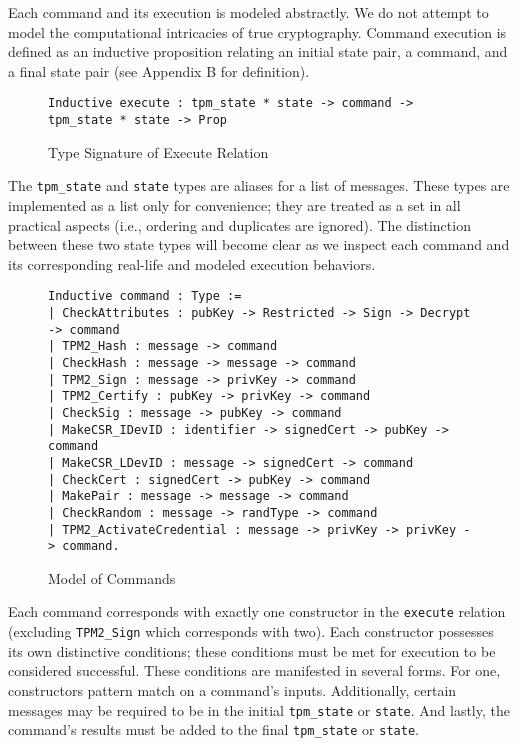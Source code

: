 Each command and its execution is modeled abstractly. We do not attempt to model the computational intricacies of true cryptography. Command execution is defined as an inductive proposition relating an initial state pair, a command, and a final state pair (see Appendix B for definition). 
\begin{figure}[h]
\begin{lstlisting}[language=Coq]
Inductive execute : tpm_state * state -> command -> tpm_state * state -> Prop
\end{lstlisting}
\caption{Type Signature of Execute Relation}
\end{figure}
The \verb|tpm_state| and \verb|state| types are aliases for a list of messages. These types are implemented as a list only for convenience; they are treated as a set in all practical aspects (i.e., ordering and duplicates are ignored). The distinction between these two state types will become clear as we inspect each command and its corresponding real-life and modeled execution behaviors.
\begin{figure}[h]
\begin{lstlisting}[language=Coq]
Inductive command : Type :=
| CheckAttributes : pubKey -> Restricted -> Sign -> Decrypt -> command
| TPM2_Hash : message -> command
| CheckHash : message -> message -> command
| TPM2_Sign : message -> privKey -> command
| TPM2_Certify : pubKey -> privKey -> command
| CheckSig : message -> pubKey -> command
| MakeCSR_IDevID : identifier -> signedCert -> pubKey -> command
| MakeCSR_LDevID : message -> signedCert -> command
| CheckCert : signedCert -> pubKey -> command
| MakePair : message -> message -> command
| CheckRandom : message -> randType -> command
| TPM2_ActivateCredential : message -> privKey -> privKey -> command.
\end{lstlisting}
\caption{Model of Commands}
\end{figure}
Each command corresponds with exactly one constructor in the \verb|execute| relation (excluding \verb|TPM2_Sign| which corresponds with two). Each constructor possesses its own distinctive conditions; these conditions must be met for execution to be considered successful. These conditions are manifested in several forms. For one, constructors pattern match on a command's inputs. Additionally, certain messages may be required to be in the initial \verb|tpm_state| or \verb|state|. And lastly, the command's results must be added to the final \verb|tpm_state| or \verb|state|.


